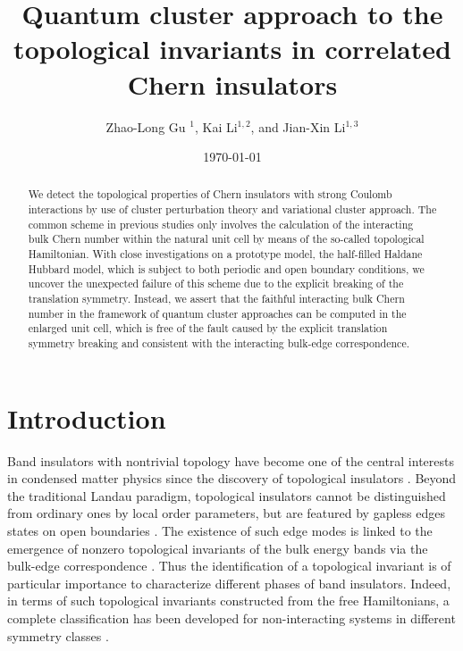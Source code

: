 \documentclass[12pt]{iopart}
\begin{document}
\title[Topological invariants in correlated Chern insulators]{Quantum cluster approach to the topological invariants in correlated Chern insulators}

\author{Zhao-Long Gu $^1$, Kai Li$^{1,2}$, and Jian-Xin Li$^{1,3}$}
\address{$^1$ National Laboratory of Solid State Microstructures and Department of Physics, Nanjing University, Nanjing 210093, China}
\address{$^2$ School of Physics and Engineering, Zhengzhou University, Zhengzhou 450001, China}
\address{$^3$ Collaborative Innovation Center of Advanced Microstructures, Nanjing University, Nanjing 210093, China}
\date{\today}

\begin{abstract}
\par We detect the topological properties of Chern insulators with strong Coulomb interactions by use of cluster perturbation theory and variational cluster approach. The common scheme in previous studies only involves the calculation of the interacting bulk Chern number within the natural unit cell by means of the so-called topological Hamiltonian. With close investigations on a prototype model, the half-filled Haldane Hubbard model, which is subject to both periodic and open boundary conditions, we uncover the unexpected failure of this scheme due to the explicit breaking of the translation symmetry. Instead, we assert that the faithful interacting bulk Chern number in the framework of quantum cluster approaches can be computed in the enlarged unit cell, which is free of the fault caused by the explicit translation symmetry breaking and consistent with the interacting bulk-edge correspondence.

\end{abstract}

\submitto{\NJP}
\maketitle

\section{Introduction}

\par Band insulators with nontrivial topology have become one of the central interests in condensed matter physics since the discovery of topological insulators \cite{HK_RMP2010,QZ_RMP2011}. Beyond the traditional Landau paradigm, topological insulators cannot be distinguished from ordinary ones by local order parameters, but are featured by gapless edges states on open boundaries \cite{H_PRL1988,K_PU2001,KM_PRL2005,BHZ_S2006,LYGJ_PRB2016,LGLW_NJP2017}. The existence of such edge modes is linked to the emergence of nonzero topological invariants of the bulk energy bands via the bulk-edge correspondence \cite{QWZ_PRB2006}. Thus the identification of a topological invariant is of particular importance to characterize different phases of band insulators. Indeed, in terms of such topological invariants constructed from the free Hamiltonians, a complete classification has been developed for non-interacting systems in different symmetry classes \cite{SRFL_PRB2008}.
\end{document}
